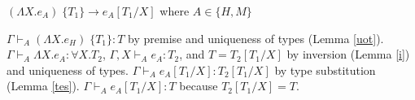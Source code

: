 \begin{case}
$(\Lambda X.e_{A})\;\lbrace T_{1}\rbrace\rightarrow e_{A}[T_{1}/X]$ where $A\in\lbrace H,M\rbrace$

$\Gamma\vdash_{A}(\Lambda X.e_{H})\;\lbrace T_{1}\rbrace:T$ by premise and uniqueness of types (Lemma \ref{uot}).  $\Gamma\vdash_{A}\Lambda X.e_{A}:\forall X.T_{2}$, $\Gamma,X\vdash_{A}e_{A}:T_{2}$, and $T=T_{2}[T_{1}/X]$ by inversion (Lemma \ref{i}) and uniqueness of types.  $\Gamma\vdash_{A}e_{A}[T_{1}/X]:T_{2}[T_{1}/X]$ by type substitution (Lemma \ref{tes}).  $\Gamma\vdash_{A}e_{A}[T_{1}/X]:T$ because $T_{2}[T_{1}/X]=T$.
\end{case}